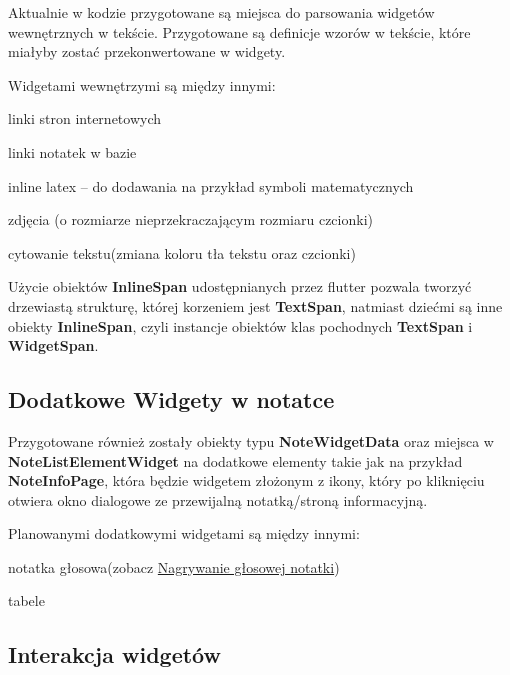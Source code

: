 Aktualnie w kodzie przygotowane są miejsca do parsowania widgetów wewnętrznych w tekście. Przygotowane są definicje wzorów w tekście, które miałyby zostać przekonwertowane w widgety.

Widgetami wewnętrzymi są między innymi:

\begin{compactitem}
    \item linki stron internetowych
    \item linki notatek w bazie
    \item inline latex -- do dodawania na przykład symboli matematycznych
    \item zdjęcia (o rozmiarze nieprzekraczającym rozmiaru czcionki)
    \item cytowanie tekstu(zmiana koloru tła tekstu oraz czcionki)
\end{compactitem}

Użycie obiektów \textbf{InlineSpan} udostępnianych przez flutter pozwala tworzyć drzewiastą strukturę, której korzeniem jest \textbf{TextSpan}, natmiast dziećmi są inne obiekty \textbf{InlineSpan}, czyli instancje obiektów klas pochodnych \textbf{TextSpan} i \textbf{WidgetSpan}.

\subsection{Dodatkowe Widgety w notatce}

Przygotowane również zostały obiekty typu \textbf{NoteWidgetData} oraz miejsca w \textbf{NoteListElementWidget} na dodatkowe elementy takie jak na przykład \textbf{NoteInfoPage}, która będzie widgetem złożonym z ikony, który po kliknięciu otwiera okno dialogowe ze przewijalną notatką/stroną informacyjną.

Planowanymi dodatkowymi widgetami są między innymi:

\begin{compactitem}
    \item notatka głosowa(zobacz \hyperlink{sec:glosowaNotatka}{Nagrywanie głosowej notatki})
    \item tabele
    \item 
\end{compactitem}

\subsection{Interakcja widgetów}

